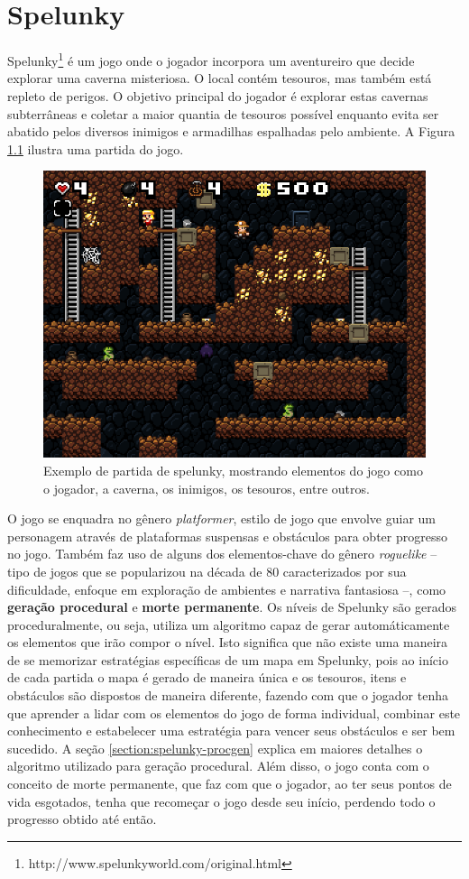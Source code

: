 \chapter{\label{chap:spelunky}Spelunky}
Spelunky\footnote{http://www.spelunkyworld.com/original.html} é um jogo onde o
jogador incorpora um aventureiro que decide explorar uma caverna misteriosa. O
local contém tesouros, mas também está repleto de perigos. O objetivo principal
do jogador é explorar estas cavernas subterrâneas e coletar a maior quantia de
tesouros possível enquanto evita ser abatido pelos diversos inimigos e
armadilhas espalhadas pelo ambiente. A Figura \ref{fig:spelunky-gameplay}
ilustra uma partida do jogo.

\begin{figure}[htb!]
\centering
\includegraphics[width=.65\textwidth]{fig/spelunky-pc-screen.png}
\caption{\label{fig:spelunky-gameplay}Exemplo de partida de spelunky, mostrando
elementos do jogo como o jogador, a caverna, os inimigos, os tesouros, entre
outros.}
\end{figure}

O jogo se enquadra no gênero \textit{platformer}, estilo de jogo que envolve
guiar um personagem através de plataformas suspensas e obstáculos para obter
progresso no jogo. Também faz uso de alguns dos elementos-chave do gênero
\textit{roguelike} -- tipo de jogos que se popularizou na década de 80
caracterizados por sua dificuldade, enfoque em exploração de ambientes e
narrativa fantasiosa --, como \textbf{geração procedural} e \textbf{morte
permanente}. Os níveis de Spelunky são gerados proceduralmente, ou seja, utiliza
um algoritmo capaz de gerar automáticamente os elementos que irão compor o
nível. Isto significa que não existe uma maneira de se memorizar estratégias
específicas de um mapa em Spelunky, pois ao início de cada partida o mapa é
gerado de maneira única e os tesouros, itens e obstáculos são dispostos de
maneira diferente, fazendo com que o jogador tenha que aprender a lidar com os
elementos do jogo de forma individual, combinar este conhecimento e estabelecer
uma estratégia para vencer seus obstáculos e ser bem sucedido. A seção
\ref{section:spelunky-procgen} explica em maiores detalhes o algoritmo utilizado
para geração procedural. Além disso, o jogo conta com o conceito de morte
permanente, que faz com que o jogador, ao ter seus pontos de vida esgotados,
tenha que recomeçar o jogo desde seu início, perdendo todo o progresso obtido
até então.



